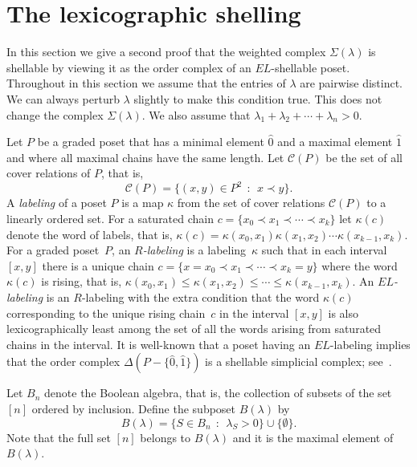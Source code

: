 \documentclass[ALCO,ThmDefs,Unicode,epreuves]{cedram}
\newcommand{\hz}{\hat{0}}
\newcommand{\ho}{\hat{1}}
\newcommand{\coveredby}{\prec}
\newcommand{\lambdasumpositive}
{\lambda_{1} + \lambda_{2} + \cdots + \lambda_{n} > 0}
\begin{document}
\section{The lexicographic shelling}
\label{section_lexicographic_shelling}


In this section we give a second proof that the weighted complex
$\Sigma(\lambda)$ is shellable by viewing it as the order
complex of an $EL$-shellable poset.
Throughout in this section we assume that the entries of $\lambda$
are pairwise distinct. We can always perturb $\lambda$
slightly to make this condition true. This does not
change the complex $\Sigma(\lambda)$.
We also assume that $\lambdasumpositive$.



Let $P$ be a graded poset  that 
has a minimal element $\hz$ and a maximal element $\ho$
and where all maximal chains have the same length.
Let $\mathcal{C}(P)$ be the set of all cover relations of $P$,
that is,
$$ \mathcal{C}(P) = \{(x,y) \in P^{2} \:\: : \:\: x \coveredby y\} . $$
A \emph{labeling} of a poset $P$ is a map
$\kappa$ from the set of cover relations $\mathcal{C}(P)$
to a linearly ordered set.
For a saturated chain
$c = \{x_{0} \coveredby x_{1} \coveredby \cdots \coveredby x_{k}\}$
let $\kappa(c)$
denote the word of labels, that is,
$\kappa(c) = 
\kappa(x_{0},x_{1}) \kappa(x_{1},x_{2}) \cdots \kappa(x_{k-1},x_{k})$.
For a graded poset~$P$,
an \emph{$R$-labeling} is a labeling~$\kappa$
such that in each interval $[x,y]$ there is a unique chain
$c = \{x = x_{0} \coveredby x_{1} \coveredby \cdots \coveredby x_{k} = y\}$
where the word $\kappa(c)$ is rising, that is,
$\kappa(x_{0},x_{1}) \leq \kappa(x_{1},x_{2}) \leq \cdots \leq
\kappa(x_{k-1},x_{k})$.
An \emph{$EL$-labeling} is an $R$-labeling with the extra condition
that the word $\kappa(c)$
corresponding to the
unique rising chain~$c$ in the interval $[x,y]$
is also lexicographically least
among the set of
all the words arising from saturated chains in the interval.
It is
well-known that
a poset
having an $EL$-labeling
implies that the order complex $\Delta(P - \{\hz,\ho\})$
is a shellable simplicial complex; see~\cite[Section~2]{Bjorner}.



Let $B_{n}$ denote the Boolean algebra,
that is, the collection of subsets of the set $[n]$
ordered by inclusion.
Define the subposet $B(\lambda)$
by 
$$ B(\lambda) = \{ S \in B_{n} \:\: : \:\: \lambda_{S} > 0\} \cup \{\emptyset\}. $$
Note that the full set $[n]$
belongs to $B(\lambda)$ and it is the maximal element of $B(\lambda)$.
\end{document}

